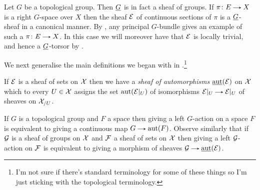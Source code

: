 \begin{example}
  \label{bundle-example}
  Let $G$ be a topological group. Then $\underline{G}$ is in fact a sheaf of
  groups. If $\pi \c E \to X$ is a right $G$-space over $X$ then the
  sheaf $\mathcal{E}$ of continuous sections of $\pi$ is a $\underline{G}$-sheaf in a
  canonical manner. By , any principal
  $G$-bundle gives an example of such a $\pi \c E \to X$. In this case
  we will moreover have that $\mathcal{E}$ is locally trivial, and hence a
  $\underline{G}$-torsor by .
\end{example}

We next generalise the main definitions we began with in
.\footnote{I'm not sure if there's standard
  terminology for some of these things so I'm just sticking with the
  topological terminology.}

\begin{definition}
  If $\mathcal{E}$ is a sheaf of sets on $\mathcal{X}$ then we have a \emph{sheaf of
    automorphisms} $\operatorname{\underline{aut}}(\mathcal{E})$ on $\mathcal{X}$ which to every $U \in \mathcal{X}$
  assigns the set $\operatorname{aut}(\mathcal{E}|_U)$ of isomorphisms $\E|_U \to \E|_U$ of
  sheaves on $\mathcal{X}_{/U}$.
\end{definition}

\begin{remark}
  If $G$ is a topological group and $F$ a space then giving a left
  $G$-action on a space $F$ is equivalent to giving a continuous map
  $G \to \aut(F)$. Observe similarly that if $\mathcal{G}$ is a sheaf of groups
  on $\mathcal{X}$ and $\mathcal{F}$ a sheaf of sets on $\mathcal{X}$ then giving a left
  $\mathcal{G}$-action on $\mathcal{F}$ is equivalent to giving a morphism of sheaves
  $\G \to \saut(\E)$.
\end{remark}


